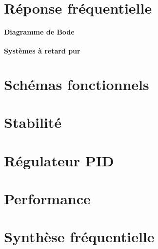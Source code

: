 \documentclass[10pt, twocolumn]{article}
\begin{document}
	\section*{Réponse fréquentielle}
		
		\paragraph{Diagramme de Bode}
		
		\paragraph{Systèmes à retard pur}
	
	\section*{Schémas fonctionnels}
	
	\section*{Stabilité}
	
	\section*{Régulateur PID}
	
	\section*{Performance}
	
	\section*{Synthèse fréquentielle}
	
\end{document}
